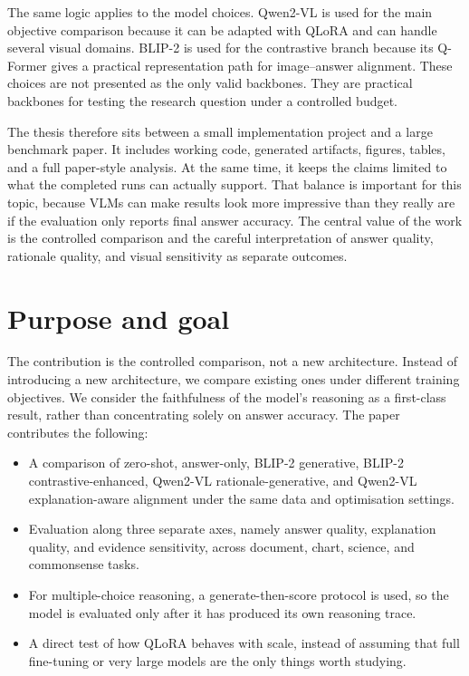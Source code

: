 \documentclass[12pt,bibliography=totoc,listof=totoc,BCOR=5mm,DIV=12,oneside,open=any]{scrbook}
\begin{document}
The same logic applies to the model choices.
Qwen2-VL is used for the main objective comparison because it can be adapted with QLoRA and can handle several visual domains.
BLIP-2 is used for the contrastive branch because its Q-Former gives a practical representation path for image--answer alignment.
These choices are not presented as the only valid backbones.
They are practical backbones for testing the research question under a controlled budget.

The thesis therefore sits between a small implementation project and a large benchmark paper.
It includes working code, generated artifacts, figures, tables, and a full paper-style analysis.
At the same time, it keeps the claims limited to what the completed runs can actually support.
That balance is important for this topic, because VLMs can make results look more impressive than they really are if the evaluation only reports final answer accuracy.
The central value of the work is the controlled comparison and the careful interpretation of answer quality, rationale quality, and visual sensitivity as separate outcomes.

\section{Purpose and goal}
The contribution is the controlled comparison, not a new architecture.
Instead of introducing a new architecture, we compare existing ones under different training objectives.
We consider the faithfulness of the model's reasoning as a first-class result, rather than concentrating solely on answer accuracy.
The paper contributes the following:

\begin{itemize}
    \item A comparison of zero-shot, answer-only, BLIP-2 generative, BLIP-2 contrastive-enhanced, Qwen2-VL rationale-generative, and Qwen2-VL explanation-aware alignment under the same data and optimisation settings.
    \item Evaluation along three separate axes, namely answer quality, explanation quality, and evidence sensitivity, across document, chart, science, and commonsense tasks.
    \item For multiple-choice reasoning, a generate-then-score protocol is used, so the model is evaluated only after it has produced its own reasoning trace.
    \item A direct test of how QLoRA behaves with scale, instead of assuming that full fine-tuning or very large models are the only things worth studying.
\end{itemize}
\end{document}
